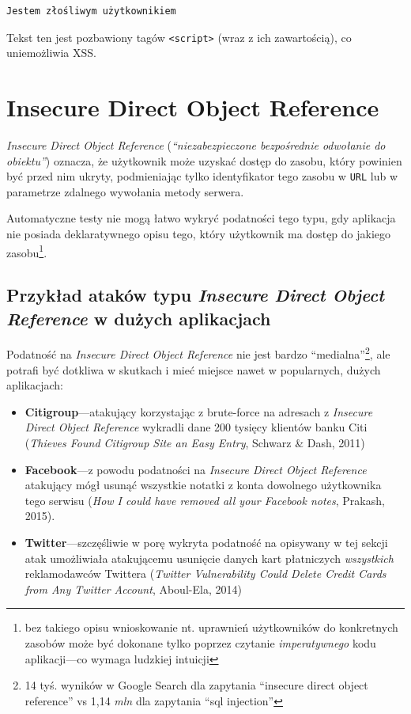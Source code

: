 \documentclass[12pt,polish,a4paper,]{report}
\providecommand{\tightlist}{%
  \setlength{\itemsep}{0pt}\setlength{\parskip}{0pt}}
\begin{document}
\begin{verbatim}
Jestem złośliwym użytkownikiem
\end{verbatim}

Tekst ten jest pozbawiony tagów \texttt{\textless{}script\textgreater{}}
(wraz z ich zawartością), co uniemożliwia XSS.

\chapter{Insecure Direct Object
Reference}\label{insecure-direct-object-reference}

\emph{Insecure Direct Object Reference} (\emph{``niezabezpieczone
bezpośrednie odwołanie do obiektu''}) oznacza, że użytkownik może
uzyskać dostęp do zasobu, który powinien być przed nim ukryty,
podmieniając tylko identyfikator tego zasobu w \texttt{URL} lub w
parametrze zdalnego wywołania metody serwera.

Automatyczne testy nie mogą łatwo wykryć podatności tego typu, gdy
aplikacja nie posiada deklaratywnego opisu tego, który użytkownik ma
dostęp do jakiego zasobu\footnote{bez takiego opisu wnioskowanie nt.
  uprawnień użytkowników do konkretnych zasobów może być dokonane tylko
  poprzez czytanie \emph{imperatywnego} kodu aplikacji---co wymaga
  ludzkiej intuicji}.

\section{\texorpdfstring{Przykład ataków typu \emph{Insecure Direct
Object Reference} w dużych
aplikacjach}{Przykład ataków typu Insecure Direct Object Reference w dużych aplikacjach}}\label{przykux142ad-atakuxf3w-typu-insecure-direct-object-reference-w-duux17cych-aplikacjach}

Podatność na \emph{Insecure Direct Object Reference} nie jest bardzo
``medialna''\footnote{14 tyś. wyników w Google Search dla zapytania
  ``insecure direct object reference'' vs 1,14 \emph{mln} dla zapytania
  ``sql injection''}, ale potrafi być dotkliwa w skutkach i mieć miejsce
nawet w popularnych, dużych aplikacjach:

\begin{itemize}
\tightlist
\item
  \textbf{Citigroup}---atakujący korzystając z brute-force na adresach z
  \emph{Insecure Direct Object Reference} wykradli dane 200 tysięcy
  klientów banku Citi (\emph{Thieves Found Citigroup Site an Easy
  Entry}, Schwarz \& Dash, 2011)
\item
  \textbf{Facebook}---z powodu podatności na \emph{Insecure Direct
  Object Reference} atakujący mógł usunąć wszystkie notatki z konta
  dowolnego użytkownika tego serwisu (\emph{How I could have removed all
  your Facebook notes}, Prakash, 2015).
\item
  \textbf{Twitter}---szczęśliwie w porę wykryta podatność na opisywany w
  tej sekcji atak umożliwiała atakującemu usunięcie danych kart
  płatniczych \emph{wszystkich} reklamodawców Twittera (\emph{Twitter
  Vulnerability Could Delete Credit Cards from Any Twitter Account},
  Aboul-Ela, 2014)
\end{itemize}
\end{document}

